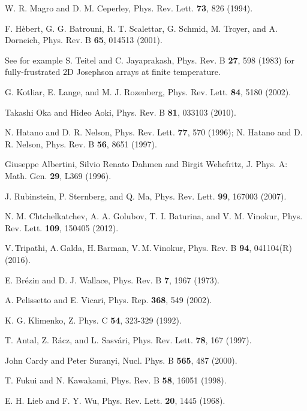 \documentclass[aps,twocolumn,prl,10pt,amsmath,amssymb,nofootinbib,showpacs,superscriptaddress,floatfix]{revtex4-1}
\begin{document}
\begin{thebibliography}{10}
	W. R. Magro and D. M. Ceperley, Phys. Rev. Lett.
	\textbf{73}, 826 (1994).
	
	F. H\`ebert, G. G. Batrouni, R. T. Scalettar, G.
	Schmid, M. Troyer, and A. Dorneich, Phys. Rev. B \textbf{65}, 014513
	(2001).
	
	See for example S. Teitel and C. Jayaprakash, Phys.
	Rev. B \textbf{27}, 598 (1983) for fully-frustrated 2D Josephson arrays
	at finite temperature.
	
	G. Kotliar, E. Lange, and M. J. Rozenberg, Phys.
	Rev. Lett. \textbf{84}, 5180 (2002).
	
	Takashi Oka and Hideo Aoki, Phys. Rev. B \textbf{81},
	033103 (2010).
	
	N. Hatano and D. R. Nelson, Phys. Rev. Lett. \textbf{77},
	570 (1996); N. Hatano and D. R. Nelson, Phys. Rev. B \textbf{56},
	8651 (1997).
	
	Giuseppe Albertini, Silvio Renato Dahmen and Birgit
	Wehefritz, J. Phys. A: Math. Gen. \textbf{29}, L369 (1996).
	
	J. Rubinstein, P. Sternberg, and Q. Ma, Phys.
	Rev. Lett. \textbf{99}, 167003 (2007).
	
	N. M. Chtchelkatchev, A. A. Golubov, T. I. Baturina,
	and V. M. Vinokur, Phys. Rev. Lett. \textbf{109}, 150405 (2012).
	
	V.\,Tripathi, A.\,Galda, H.\,Barman,
	V.\,M.\,Vinokur, Phys. Rev. B \textbf{94}, 041104(R) (2016).
	
	E. Br\'ezin and D. J. Wallace, Phys. Rev. B \textbf{7},
	1967 (1973).
	
	A. Pelissetto and E. Vicari, Phys. Rep. \textbf{368},
	549 (2002).
	
	K. G. Klimenko, Z. Phys. C \textbf{54}, 323-329
	(1992).
	
	T. Antal, Z. R\'{a}cz, and L. Sasv\'{a}ri, Phys.
	Rev. Lett. \textbf{78}, 167 (1997).
	
	John Cardy and Peter Suranyi, Nucl. Phys. B \textbf{565},
	487 (2000).
	
	T. Fukui and N. Kawakami, Phys. Rev. B \textbf{58},
	16051 (1998).
	
	E. H. Lieb and F. Y. Wu, Phys. Rev. Lett. \textbf{20},
	1445 (1968). \end{thebibliography}
\end{document}
